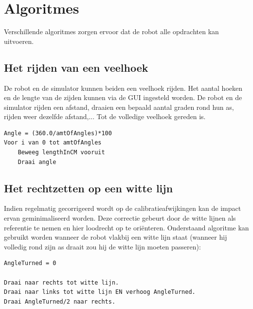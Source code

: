 \documentclass[tt3]{penoverslag}
\begin{document}
\section{Algoritmes} %
\label{sec:algo}
Verschillende algoritmes zorgen ervoor dat de robot alle opdrachten kan uitvoeren.

\subsection{Het rijden van een veelhoek} %
\label{ssec:algoVeelH}
De robot en de simulator kunnen beiden een veelhoek rijden. Het aantal hoeken en de lengte van de zijden kunnen via de GUI ingesteld worden. De robot en de simulator rijden een afstand, draaien een bepaald aantal graden rond hun as, rijden weer dezelfde afstand,... Tot de volledige veelhoek gereden is. 

\lstset{frame=single, language=Java, caption=Veelhoek algoritme (pseudocode),
    	label=code:algoVeelH, numbers=left, numberstyle=\footnotesize,
		basicstyle=\sffamily, numbersep=5pt}
\begin{lstlisting}
Angle = (360.0/amtOfAngles)*100
Voor i van 0 tot amtOfAngles
	Beweeg lengthInCM vooruit
	Draai angle
\end{lstlisting}


\subsection{Het rechtzetten op een witte lijn} %
\label{ssec:algoWitteL}
Indien regelmatig gecorrigeerd wordt op de calibratieafwijkingen kan de impact ervan geminimaliseerd worden. Deze correctie gebeurt door de witte lijnen als referentie te nemen en hier loodrecht op te ori\"enteren.
Onderstaand algoritme kan gebruikt worden wanneer de robot vlakbij een witte lijn staat (wanneer hij volledig rond zijn as draait zou hij de witte lijn moeten passeren):

\lstset{frame=single, caption=Witte Lijn algoritme (pseudocode),
		label=code:algoWitteL, numbers=left, numberstyle=\footnotesize,
		basicstyle=\sffamily, numbersep=5pt}
\begin{lstlisting}
AngleTurned = 0

Draai naar rechts tot witte lijn.
Draai naar links tot witte lijn EN verhoog AngleTurned.
Draai AngleTurned/2 naar rechts.
\end{lstlisting}

\end{document}
